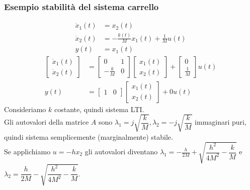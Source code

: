 \documentclass{article}
\begin{document}
\subsubsection{Esempio stabilità del sistema carrello}
\begin{align*}
    \dot x_1(t) &= x_2(t) \\
    \dot x_2(t) &= - \frac{k(t)}{M}x_1(t) + \frac{1}{M} u(t) \\
    y(t) &= x_1(t)
\end{align*}
\begin{align*}
    \begin{bmatrix}
        \dot x_1(t)\\
        \dot x_2(t)
    \end{bmatrix} &=
    \begin{bmatrix}
        0 & 1\\
        - \frac{k}{M} & 0
    \end{bmatrix}
    \begin{bmatrix}
        x_1(t)\\
        x_2(t)
    \end{bmatrix}
    +
    \begin{bmatrix}
        0\\
        \frac{1}{M}
    \end{bmatrix} u(t)
    \\
    y(t) &= \begin{bmatrix}
        1 & 0
    \end{bmatrix}
    \begin{bmatrix}
        x_1(t)\\
        x_2(t)
    \end{bmatrix} + 0 u(t)
\end{align*}
Consideriamo $k$ costante, quindi sistema LTI.\\
Gli autovalori della matrice $A$ sono $\lambda_1 = j \sqrt{\dfrac{k}{M}}, \lambda_2 = -j \sqrt{\dfrac{k}{M}}$ immaginari puri, quindi sistema semplicemente (marginalmente) stabile.
\vspace*{0.2cm}\\
Se applichiamo $u=-h x_2$ gli autovalori diventano $\lambda_1 = - \frac{h}{2M} + \sqrt{\dfrac{h^2}{4M^2}-\dfrac{k}{M}}$ e $\lambda_2 = \dfrac{h}{2M} - \sqrt{\dfrac{h^2}{4M^2}-\dfrac{k}{M}}$.\\
\end{document}
